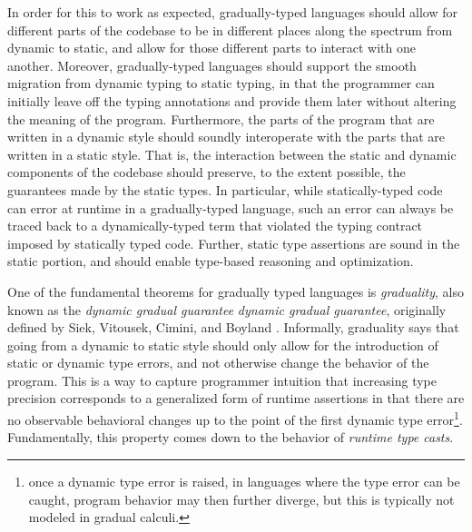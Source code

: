 In order for this to work as expected, gradually-typed languages should allow for
different parts of the codebase to be in different places along the spectrum from
dynamic to static, and allow for those different parts to interact with one another.
Moreover, gradually-typed languages should support the smooth migration from
dynamic typing to static typing, in that the programmer can initially leave off the
typing annotations and provide them later without altering the meaning of the program.
Furthermore, the parts of the program that are written in a dynamic
style should soundly interoperate with the parts that are written in a
static style.  That is, the interaction between the static and dynamic
components of the codebase should preserve, to the extent possible,
the guarantees made by the static types.  In particular, while
statically-typed code can error at runtime in a gradually-typed
language, such an error can always be traced back to a
dynamically-typed term that violated the typing contract imposed by
statically typed code. Further, static type assertions are sound in
the static portion, and should enable type-based reasoning and
optimization.


One of the fundamental theorems for gradually typed languages is
\emph{graduality}, also known as the \emph{dynamic gradual guarantee}
\emph{dynamic gradual guarantee}, originally defined by Siek,
Vitousek, Cimini, and Boyland \cite{siek_et_al:LIPIcs:2015:5031,
  new-ahmed2018}.
%
Informally, graduality says that going from a dynamic to static style should only allow for the introduction of static or dynamic type errors, and not otherwise change the behavior of the program.
%
This is a way to capture programmer intuition that increasing type
precision corresponds to a generalized form of runtime assertions in
that there are no observable behavioral changes up to the point of the
first dynamic type error\footnote{once a dynamic type error is raised,
in languages where the type error can be caught, program behavior may
then further diverge, but this is typically not modeled in gradual
calculi.}.
%
Fundamentally, this property comes down to the behavior of
\emph{runtime type casts}.

